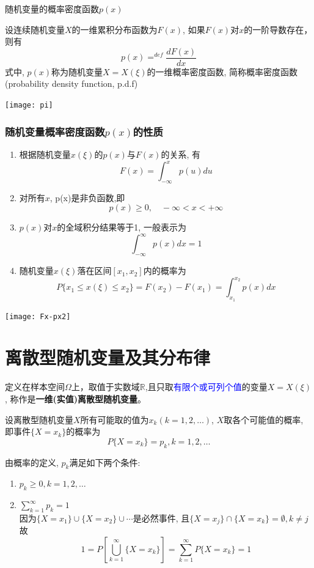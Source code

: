 \begin{frame}{随机变量的概率密度函数$p(x)$}
\begin{definition}
	设连续随机变量$X$的一维累积分布函数为$F(x)$, 如果$F(x)$对$x$的一阶导数存在，则有
	\[p(x)\mathop{=}^{def}\frac{dF(x)}{dx}\]
	式中, $p(x)$称为随机变量$X=X(\xi)$的一维概率密度函数, 简称概率密度函数(probability density function, p.d.f)
\end{definition}
\texttt{[image: pi]}
\end{frame}

\begin{frame}[shrink]
\frametitle{随机变量概率密度函数$p(x)$的性质}
\begin{enumerate}
	\item 根据随机变量$x(\xi)$的$p(x)$与$F(x)$的关系, 有
	\[F(x)=\int_{-\infty}^{x}p(u)du\]
	\item 对所有$x$, p(x)是非负函数,即
	\[p(x)\ge 0,\quad -\infty<x<+\infty \]
	\item $p(x)$对$x$的全域积分结果等于1, 一般表示为
	\[\int_{-\infty}^{\infty}p(x)dx=1\]
	\item 随机变量$x(\xi)$落在区间$[x_1,x_2]$内的概率为
	\[P\{x_1\le x(\xi)\le x_2\}=F(x_2)-F(x_1)=\int_{x_1}^{x_2}p(x)dx\]
\end{enumerate}
\texttt{[image: Fx-px2]}
\end{frame}

\section{离散型随机变量及其分布律}

\begin{frame}[shrink]
\begin{definition}[离散型随机变量]
	定义在样本空间$\Omega$上，取值于实数域$\mathbb{R}$,且只取\textcolor{blue}{有限个或可列个值}的变量$X=X(\xi)$, 称作是\textbf{一维(实值)离散型随机变量}。\\
\end{definition}

\begin{definition}[离散型随机变量的概率]
	设离散型随机变量$X$所有可能取的值为$x_k(k=1,2,\dots)$, $X$取各个可能值的概率, 即事件$\{X=x_k\}$的概率为
	\[P\{X=x_k\}=p_k, k=1,2,\dots\]
\end{definition}

由概率的定义, $p_k$满足如下两个条件: 
\begin{enumerate}
	\item $p_k\ge 0, k=1,2,\dots$
	\item $\sum\limits_{k=1}^{\infty}p_k=1$\\
	因为$\{X=x_1\}\cup\{X=x_2\}\cup\cdots$是必然事件, 且$\{X=x_j\}\cap\{X=x_k\}=\emptyset, k\ne j$故
	\[1=P[\bigcup_{k=1}^{\infty}\{X=x_k\}]=\sum_{k=1}^{\infty}P\{X=x_k\}=1 \]
\end{enumerate}
\end{frame}

